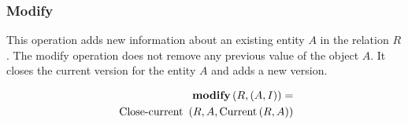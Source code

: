 %
\subsubsection{\label{subsubsec:modify}Modify}
This operation adds new information about an existing entity $A$ in the relation $R$. The modify operation does not remove any previous value of the object $A$. It closes the current version for the entity $A$ and adds a new version.



\begin{align}
\label{eq:modify}
\MOD \left( R, \left(A, I \right)\right) =\\
\nonumber
\mbox{ Close-current }\left(R, A, \mbox{Current}\left(R, A \right) \right) %
\end{align}


